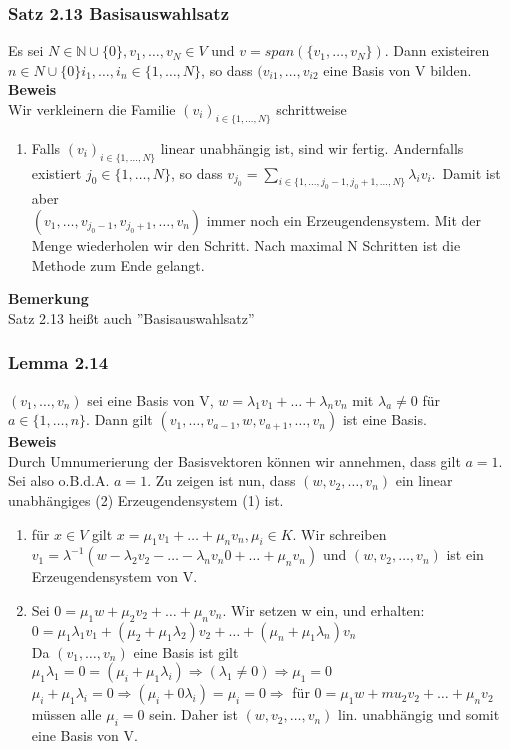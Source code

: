\documentclass{scrartcl}
\newcommand{\lb}{\lambda}
\newcommand{\N}{\mathbb{N}}
\begin{document}
\subsubsection{Satz 2.13 Basisauswahlsatz}
Es sei \(N \in \N \cup \{0\}, v_1, \dots, v_N \in V\) und \(v = span(\{v_1, \dots, v_N\})\). Dann existeiren \(n \in N \cup \{0\} i_1, \dots, i_n \in \{1, \dots, N\}\), so dass \((v_{i1}, \dots, v_{i2}\) eine Basis von V bilden.\\
\textbf{Beweis}\\
Wir verkleinern die Familie \((v_i)_{i \in \{1, \dots, N\}}\) schrittweise
\begin{enumerate}
\item{Falls \((v_i)_{i \in \{1, \dots, N\}}\) linear unabh\"angig ist, sind wir fertig. Andernfalls existiert \(j_0 \in \{1, \dots, N\}\), so dass \(v_{j_0} = \sum_{i \in \{1, \dots, j_0 - 1, j_0 + 1, \dots, N\}}\lb_i v_i\).\ Damit ist aber\\
\((v_1, \dots, v_{j_0 - 1}, v_{j_0 + 1}, \dots, v_n)\) immer noch ein Erzeugendensystem. Mit der Menge wiederholen wir den Schritt. Nach maximal N Schritten ist die Methode zum Ende gelangt.}
\end{enumerate}
\textbf{Bemerkung}\\
Satz 2.13 hei\ss{}t auch ''Basisauswahlsatz''

\subsubsection{Lemma 2.14}
\((v_1, \dots, v_n)\) sei eine Basis von V, \(w = \lb_1v_1 + \dots +  \lb_n v_n\) mit \(\lb_a \neq 0\) f\"ur \(a \in \{1, \dots, n\}\). Dann gilt \((v_1, \dots, v_{a - 1}, w, v_{a+1}, \dots, v_n)\) ist eine Basis.\\
\textbf{Beweis}\\
Durch Umnumerierung der Basisvektoren k\"onnen wir annehmen, dass gilt \(a = 1\). Sei also o.B.d.A. \(a = 1\). Zu zeigen ist nun, dass \((w, v_2, \dots, v_n)\) ein linear unabh\"angiges (2) Erzeugendensystem (1) ist.
\begin{enumerate}
\item{f\"ur \(x \in V\) gilt \(x = \mu_1 v_1 + \dots + \mu_n v_n, \mu_i \in K\). Wir schreiben\\
\(v_1 = \lb^{-1}(w-\lb_2 v_2 - \dots - \lb_n v_n0 + \dots + \mu_n v_n)\) und \((w, v_2, \dots, v_n)\) ist ein Erzeugendensystem von V.}
\item{Sei \(0 = \mu_1 w + \mu_2 v_2 + \dots + \mu_n v_n\). Wir setzen w ein, und erhalten:\\
\(0 = \mu_1 \lb_1 v_1 + (\mu_2  + \mu_1 \lb_2) v_2 + \dots + (\mu_n + \mu_1 \lb_n)v_n\)\\
Da \((v_1, \dots, v_n)\) eine Basis ist gilt \(\mu_1\lb_1 = 0 = (\mu_i + \mu_1 \lb_i) \Rightarrow (\lb_1 \neq 0) \Rightarrow \mu_1 = 0\)\\
\(\mu_i + \mu_1 \lb_i = 0 \Rightarrow (\mu_i + 0 \lb_i) = \mu_i = 0 \Rightarrow\) f\"ur \(0 = \mu_1 w + mu_2 v_2 + \dots + \mu_n v_2\) m\"ussen alle  \(\mu_i = 0\) sein. Daher ist \((w, v_2, \dots, v_n)\) lin. unabh\"angig und somit eine Basis von V.}
\end{enumerate}
\end{document}

